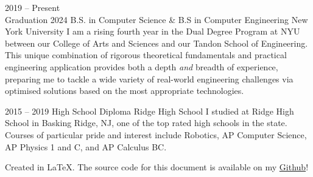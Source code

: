 \documentclass[9pt]{developercv} %
\begin{document}


\begin{entrylist}
	\entry
	{
		2019 -- Present
		\\
		\footnotesize{Graduation 2024}
	}
	{B.S. in Computer Science \& B.S in Computer Engineering}
	{New York University}
	{
		I am a rising fourth year in the Dual Degree Program at NYU between our College of Arts and Sciences and our Tandon School of Engineering.
		This unique combination of rigorous theoretical fundamentals and practical engineering application provides both a depth \textit{and} breadth of experience, preparing me to tackle a wide variety of real-world engineering challenges via optimised solutions based on the most appropriate technologies.
	}

	\entry
	{2015 -- 2019}
	{High School Diploma}
	{Ridge High School}
	{
	  I studied at Ridge High School in Basking Ridge, NJ, one of the top rated high schools in the state. Courses of particular pride and interest include Robotics, AP Computer Science, AP Physics 1 and C, and AP Calculus BC.
	}
\end{entrylist}


\vspace{30pt}
Created in \LaTeX.
The source code for this document is available on my  \href{https://github.com/Cosmic-Goat?tab=repositories}{Github}!
\end{document}
